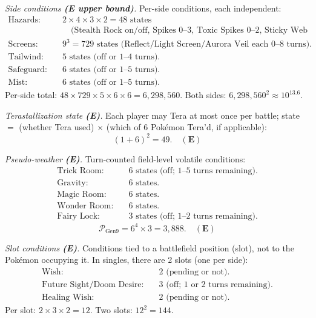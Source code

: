 \emph{Side conditions \textbf{(E upper bound)}.}
Per-side conditions, each independent:
\begin{align*}
    \text{Hazards:} &\quad 2 \times 4 \times 3 \times 2 = 48 \text{ states} \\
                    &\qquad \text{(Stealth Rock on/off, Spikes 0--3, Toxic Spikes 0--2, Sticky Web on/off).} \\
    \text{Screens:} &\quad 9^3 = 729 \text{ states (Reflect/Light Screen/Aurora Veil each 0--8 turns).} \\
    \text{Tailwind:} &\quad 5 \text{ states (off or 1--4 turns).} \\
    \text{Safeguard:} &\quad 6 \text{ states (off or 1--5 turns).} \\
    \text{Mist:} &\quad 6 \text{ states (off or 1--5 turns).}
\end{align*}
Per-side total: $48 \times 729 \times 5 \times 6 \times 6 = 6{,}298{,}560$. Both sides: $6{,}298{,}560^2 \approx 10^{13.6}$.

\emph{Terastallization state \textbf{(E)}.}
Each player may Tera at most once per battle; state $=$ (whether Tera used) $\times$ (which of 6 Pokémon Tera'd, if applicable):
\begin{equation}
    (1 + 6)^2 = 49. \quad \mathbf{(E)}
\end{equation}

\emph{Pseudo-weather \textbf{(E)}.}
Turn-counted field-level volatile conditions:
\begin{align*}
    \text{Trick Room:} &\quad 6 \text{ states (off; 1--5 turns remaining).} \\
    \text{Gravity:} &\quad 6 \text{ states.} \\
    \text{Magic Room:} &\quad 6 \text{ states.} \\
    \text{Wonder Room:} &\quad 6 \text{ states.} \\
    \text{Fairy Lock:} &\quad 3 \text{ states (off; 1--2 turns remaining).}
\end{align*}
\begin{equation}
    \mathcal{P}_{\text{Gen9}} = 6^4 \times 3 = 3{,}888. \quad \mathbf{(E)}
\end{equation}

\emph{Slot conditions \textbf{(E)}.}
Conditions tied to a battlefield position (slot), not to the Pok\'emon occupying it.
In singles, there are 2 slots (one per side):
\begin{align*}
    \text{Wish:} &\quad 2 \text{ (pending or not).} \\
    \text{Future Sight/Doom Desire:} &\quad 3 \text{ (off; 1 or 2 turns remaining).} \\
    \text{Healing Wish:} &\quad 2 \text{ (pending or not).}
\end{align*}
Per slot: $2 \times 3 \times 2 = 12$. Two slots: $12^2 = 144$.

